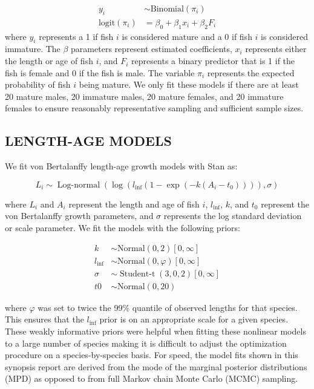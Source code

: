 \documentclass[11pt]{book}\usepackage[]{graphicx}\usepackage[]{color}
\begin{document}
\begin{align}
y_i &\sim \mathrm{Binomial}(\pi_i)\\
\mathrm{logit} \left( \pi_i \right) &= \beta_0 + \beta_1 x_i + \beta_2 F_i
\end{align}
where $y_i$ represents a 1 if fish $i$ is considered mature and a 0 if fish $i$
is considered immature. The $\beta$ parameters represent estimated coefficients,
$x_i$ represents either the length or age of fish $i$, and $F_i$ represents
a binary predictor that is 1 if the fish is female and 0 if the fish is male.
The variable $\pi_i$ represents the expected probability of fish $i$ being
mature. We only fit these models if there are at least 20 mature males, 20
immature males, 20 mature females, and 20 immature females to ensure reasonably
representative sampling and sufficient sample sizes.

\subsection{LENGTH-AGE MODELS} \label{sec:length-age-models}

We fit von Bertalanffy length-age growth models \citep{vonbertalanffy1938} with
Stan \citep{rstan2018} as:

\begin{equation}
  L_i \sim \operatorname{Log-normal}
  \left( \log(l_\mathrm{inf} (1 - \exp(-k (A_i - t_0)))), \sigma \right)
\end{equation}

where $L_i$ and $A_i$ represent the length and age of fish $i$,
$l_\mathrm{inf}$, $k$, and $t_0$ represent the von Bertalanffy growth
parameters, and $\sigma$ represents the log standard deviation or scale
parameter. We fit the models with the following priors:

\begin{align}
  k &\sim \mathrm{Normal}\left(0, 2\right)[0, \infty]\\
  l_\mathrm{inf} &\sim  \mathrm{Normal} \left(0, \varphi \right)[0, \infty]\\
  \sigma &\sim  \operatorname{Student-t}\left(3, 0, 2 \right)[0, \infty]\\
  t0 &\sim  \mathrm{Normal}(0, 20)
\end{align}

where $\varphi$ was set to twice the 99\% quantile of observed lengths for that
species. This ensures that the $l_\mathrm{inf}$ prior is on an appropriate scale
for a given species. These weakly informative priors were helpful when fitting
these nonlinear models to a large number of species making it is difficult to
adjust the optimization procedure on a species-by-species basis. For speed, the
model fits shown in this synopsis report are derived from the mode of the
marginal posterior distributions (MPD) as opposed to from full Markov chain
Monte Carlo (MCMC) sampling.
\end{document}
